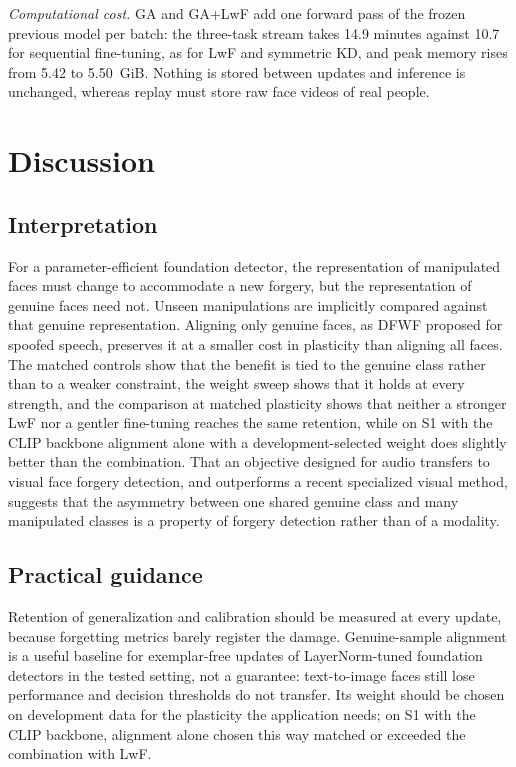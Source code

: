 \documentclass{ieeeaccess}
\begin{document}
\textit{Computational cost.} GA and GA+LwF add one forward pass of the frozen previous model per batch: the three-task stream takes 14.9 minutes against 10.7 for sequential fine-tuning, as for LwF and symmetric KD, and peak memory rises from 5.42 to 5.50~GiB. Nothing is stored between updates and inference is unchanged, whereas replay must store raw face videos of real people.

\section{Discussion}
\label{sec:discussion}

\subsection{Interpretation}
For a parameter-efficient foundation detector, the representation of manipulated faces must change to accommodate a new forgery, but the representation of genuine faces need not. Unseen manipulations are implicitly compared against that genuine representation. Aligning only genuine faces, as DFWF proposed for spoofed speech, preserves it at a smaller cost in plasticity than aligning all faces. The matched controls show that the benefit is tied to the genuine class rather than to a weaker constraint, the weight sweep shows that it holds at every strength, and the comparison at matched plasticity shows that neither a stronger LwF nor a gentler fine-tuning reaches the same retention, while on S1 with the CLIP backbone alignment alone with a development-selected weight does slightly better than the combination. That an objective designed for audio transfers to visual face forgery detection, and outperforms a recent specialized visual method, suggests that the asymmetry between one shared genuine class and many manipulated classes is a property of forgery detection rather than of a modality.

\subsection{Practical guidance}
Retention of generalization and calibration should be measured at every update, because forgetting metrics barely register the damage. Genuine-sample alignment is a useful baseline for exemplar-free updates of LayerNorm-tuned foundation detectors in the tested setting, not a guarantee: text-to-image faces still lose performance and decision thresholds do not transfer. Its weight should be chosen on development data for the plasticity the application needs; on S1 with the CLIP backbone, alignment alone chosen this way matched or exceeded the combination with LwF.
\end{document}
